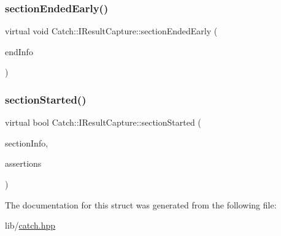 \hypertarget{struct_catch_1_1_i_result_capture_afcc71eef8ca821ae132cced4a2be6988}{}\label{struct_catch_1_1_i_result_capture_afcc71eef8ca821ae132cced4a2be6988} 
\subsubsection{\texorpdfstring{section\+Ended\+Early()}{sectionEndedEarly()}}
{\footnotesize\ttfamily virtual void Catch\+::\+I\+Result\+Capture\+::section\+Ended\+Early (\begin{DoxyParamCaption}\item[{\hyperlink{struct_catch_1_1_section_end_info}{Section\+End\+Info} const \&}]{end\+Info }\end{DoxyParamCaption})\hspace{0.3cm}{\ttfamily [pure virtual]}}

\hypertarget{struct_catch_1_1_i_result_capture_a5b76ed52badcb64cf374202e12b81a03}{}\label{struct_catch_1_1_i_result_capture_a5b76ed52badcb64cf374202e12b81a03} 
\subsubsection{\texorpdfstring{section\+Started()}{sectionStarted()}}
{\footnotesize\ttfamily virtual bool Catch\+::\+I\+Result\+Capture\+::section\+Started (\begin{DoxyParamCaption}\item[{\hyperlink{struct_catch_1_1_section_info}{Section\+Info} const \&}]{section\+Info,  }\item[{\hyperlink{struct_catch_1_1_counts}{Counts} \&}]{assertions }\end{DoxyParamCaption})\hspace{0.3cm}{\ttfamily [pure virtual]}}



The documentation for this struct was generated from the following file\+:\begin{DoxyCompactItemize}
\item 
lib/\hyperlink{catch_8hpp}{catch.\+hpp}\end{DoxyCompactItemize}
